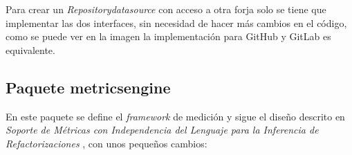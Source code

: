 
Para crear un \textit{Repositorydatasource} con acceso a otra forja solo se tiene que implementar las dos interfaces, sin necesidad de hacer más cambios en el código, como se puede ver en la imagen la implementación para GitHub y GitLab es equivalente.

\subsection{Paquete metricsengine}
En este paquete se define el \textit{framework} de medición y sigue el diseño descrito en \textit{Soporte de Métricas con Independencia del Lenguaje para la Inferencia de Refactorizaciones} \cite{marticorena_sanchez_soporte_2005}, con unos pequeños cambios:

